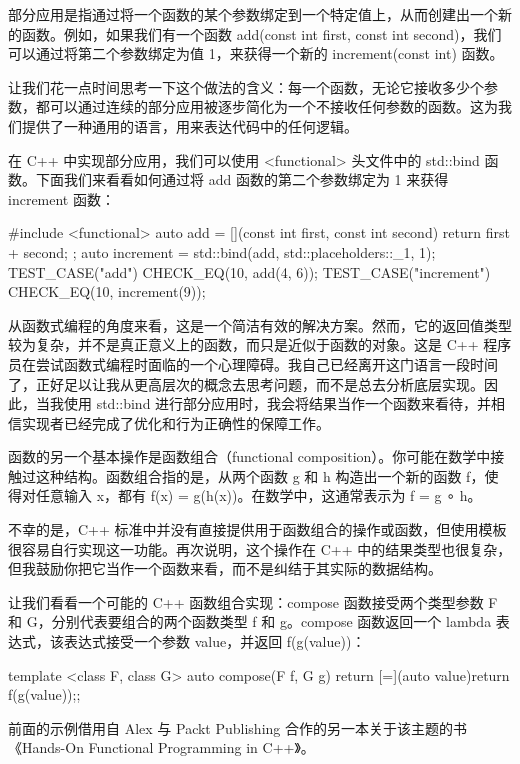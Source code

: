 部分应用是指通过将一个函数的某个参数绑定到一个特定值上，从而创建出一个新的函数。例如，如果我们有一个函数 add(const int first, const int second)，我们可以通过将第二个参数绑定为值 1，来获得一个新的 increment(const int) 函数。

让我们花一点时间思考一下这个做法的含义：每一个函数，无论它接收多少个参数，都可以通过连续的部分应用被逐步简化为一个不接收任何参数的函数。这为我们提供了一种通用的语言，用来表达代码中的任何逻辑。

在 C++ 中实现部分应用，我们可以使用 <functional> 头文件中的 std::bind 函数。下面我们来看看如何通过将 add 函数的第二个参数绑定为 1 来获得 increment 函数：

\begin{cpp}
#include <functional>
auto add = [](const int first, const int second){ return first +
second; };
auto increment = std::bind(add, std::placeholders::_1, 1);
TEST_CASE("add"){
  CHECK_EQ(10, add(4, 6));
}
TEST_CASE("increment"){
  CHECK_EQ(10, increment(9));
}
\end{cpp}

从函数式编程的角度来看，这是一个简洁有效的解决方案。然而，它的返回值类型较为复杂，并不是真正意义上的函数，而只是近似于函数的对象。这是 C++ 程序员在尝试函数式编程时面临的一个心理障碍。我自己已经离开这门语言一段时间了，正好足以让我从更高层次的概念去思考问题，而不是总去分析底层实现。因此，当我使用 std::bind 进行部分应用时，我会将结果当作一个函数来看待，并相信实现者已经完成了优化和行为正确性的保障工作。

函数的另一个基本操作是函数组合（functional composition）。你可能在数学中接触过这种结构。函数组合指的是，从两个函数 g 和 h 构造出一个新的函数 f，使得对任意输入 x，都有 f(x) = g(h(x))。在数学中，这通常表示为 f = g ∘ h。

不幸的是，C++ 标准中并没有直接提供用于函数组合的操作或函数，但使用模板很容易自行实现这一功能。再次说明，这个操作在 C++ 中的结果类型也很复杂，但我鼓励你把它当作一个函数来看，而不是纠结于其实际的数据结构。

让我们看看一个可能的 C++ 函数组合实现：compose 函数接受两个类型参数 F 和 G，分别代表要组合的两个函数类型 f 和 g。compose 函数返回一个 lambda 表达式，该表达式接受一个参数 value，并返回 f(g(value))：

\begin{cpp}
template <class F, class G>
auto compose(F f, G g){
return [=](auto value){return f(g(value));};
}
\end{cpp}

\begin{myTip}{}
前面的示例借用自 Alex 与 Packt Publishing 合作的另一本关于该主题的书 《Hands-On Functional Programming in C++》。
\end{myTip}

